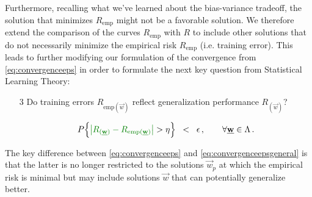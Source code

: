 {				
			Furthermore, recalling what we've learned about the bias-variance tradeoff, the solution that minimizes $R_{\text{emp}}$ might not be a favorable solution. We therefore extend the comparison of the curves $R_{\text{emp}}$ with $R$ to include other solutions that do not necessarily minimize the empirical risk $R_{\text{emp}}$ (i.e. training error). This leads to further modifying our formulation of the convergence from \eqref{eq:convergenceeps} in order to formulate the next key question from Statistical Learning Theory:
            
            \begin{enumerate}
            \item[3] Do training errors $R_{\text{emp}(\vec w)}$ 
				reflect generalization performance $R_{(\vec w)}$?
				\vspace{1mm}
                
				\begin{equation}
					P \Big\{ {\color{question2}
							\big| R_{(\vec w)} - R_{\mathrm{emp}(\vec w)} \big|
						} > \eta \Big\} \;\;<\;\; \epsilon \,, 
						\qquad \forall \vec w \in \Lambda \,.
						\label{eq:convergenceepsgeneral}
				\end{equation}
            \end{enumerate}
			
			The key difference between \eqref{eq:convergenceeps} and \eqref{eq:convergenceepsgeneral} is that the latter is no longer restricted to the solutions $\vec w_p$ at which the empirical risk is minimal but may include solutions $\vec w$ that can potentially generalize better.
}
